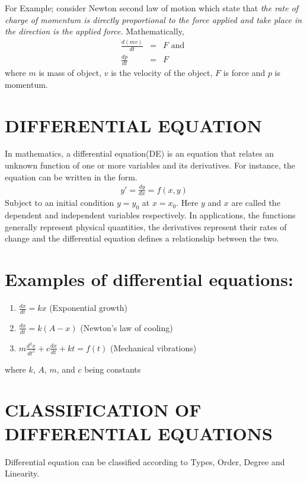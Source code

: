 \documentclass[11pt]{report}
\newcommand{\sps}{\\[0.2cm]}
\newcommand{\dsp}{\displaystyle}
\newcommand{\NI}{\noindent}
\newcommand{\sprime}{'}
\begin{document}
	\NI For Example; consider Newton second law of motion which state that \textit{the rate of charge of momentum is directly proportional to the force applied and take place in the direction is the applied force.} Mathematically, 
	\begin{eqnarray*}
		\frac{d(mv)}{dt} &=& F \text{ and }\sps
		\frac{dp}{dt} &=& F
	\end{eqnarray*}
	where $m$ is mass of object, $v$ is the velocity of the object, $F$ is force  and $p$ is momentum.
	
	\section{DIFFERENTIAL EQUATION}
	In mathematics, a differential equation(DE) is an equation that relates an unknown function of one or more variables and its derivatives. For instance, the equation can be written in the form. 
	\begin{eqnarray}
		y\sprime = \frac{dy}{dx} = f(x,y)\label{eq:2_1}
	\end{eqnarray}
	Subject to an initial condition $y=y_0$ at $x=x_0$. Here $y$ and $x$ are called the dependent  and independent variables respectively. In applications, the functions generally represent physical quantities, the derivatives represent their rates of change and the differential equation defines a relationship between the two.
	
	\section*{Examples of differential equations:}
	\begin{enumerate}
		\item $\dsp \frac{dx}{dt} = kx$ (Exponential growth)
		
		\item $\dsp\frac{dx}{dt} = k(A-x)$ (Newton's law of cooling)
		
		\item $\dsp m\frac{d^2x}{dt^2} +c\frac{dx}{dt} + kt = f(t)$ (Mechanical vibrations)
	\end{enumerate}
	where $k$, $A$, $m$,  and $c$ being constants
	
	
	\section{CLASSIFICATION OF DIFFERENTIAL EQUATIONS }
	Differential equation can be classified according to Types, Order, Degree and Linearity.
	
\end{document}
